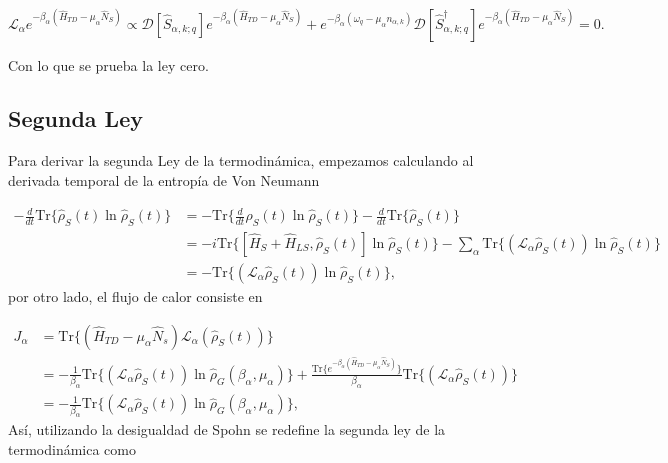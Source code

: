 \begin{appendixs}
\begin{equation*}
    \mathcal{L}_{\alpha}e^{-\beta_{\alpha}(\hat{H}_{TD} - \mu_{\alpha}\hat{N}_{S})} \propto  \mathcal{D}[\hat{S}_{\alpha,k;q}]e^{-\beta_{\alpha}(\hat{H}_{TD} - \mu_{\alpha}\hat{N}_{S})} + e^{-\beta_{\alpha}(\omega_{q} - \mu_{\alpha}n_{\alpha,k})}\mathcal{D}[\hat{S}^{\dagger}_{\alpha,k;q}]e^{-\beta_{\alpha}(\hat{H}_{TD} - \mu_{\alpha}\hat{N}_{S})} = 0.
\end{equation*}

Con lo que se prueba la ley cero.

\newpage


\subsection{Segunda Ley}
Para derivar la segunda Ley de la termodinámica, empezamos calculando al derivada temporal de la entropía de Von Neumann

\begin{align*}
    - \frac{d}{dt}\text{Tr}\{ \hat{\rho}_{S}(t)\ln \hat{\rho}_{S}(t) \} & =  -\text{Tr}\Big\{ \frac{d}{dt}\hat{\rho}_{S}(t)\ln \hat{\rho}_{S}(t) \Big\} - \frac{d}{dt}\text{Tr}\{\hat{\rho}_{S}(t) \}\\
  & = - i \text{Tr}\{[\hat{H}_{S}+\hat{H}_{LS},\hat{\rho}_{S}(t)]\ln \hat{\rho}_{S}(t)  \} - \sum_{\alpha} \text{Tr}\{(\mathcal{L}_{\alpha}\hat{\rho}_{S}(t)) \ln \hat{\rho}_{S}(t) \}  \\
  & = -\text{Tr}\{(\mathcal{L}_{\alpha}\hat{\rho}_{S}(t)) \ln \hat{\rho}_{S}(t) \},
\end{align*}
por otro lado, el flujo de calor consiste en 

\begin{align*}
    J_{\alpha} & = \text{Tr}\{ (\hat{H}_{TD} - \mu_{\alpha}\hat{N}_{s})\mathcal{L}_{\alpha}(\hat{\rho}_{S}(t)) \} \\
    & = -\frac{1}{\beta_{\alpha}} \text{Tr}\{(\mathcal{L}_{\alpha}\hat{\rho}_{S}(t)) \ln \hat{\rho}_{G}(\beta_{\alpha},\mu_{\alpha})  \} + \frac{\text{Tr}\{e^{-\beta_{\alpha}(\hat{H}_{TD} - \mu_{\alpha}\hat{N}_{S})} \} }{\beta_{\alpha}} \text{Tr}\{(\mathcal{L}_{\alpha}\hat{\rho}_{S}(t)) \} \\
    & = -\frac{1}{\beta_{\alpha}} \text{Tr}\{(\mathcal{L}_{\alpha}\hat{\rho}_{S}(t))\ln \hat{\rho}_{G}(\beta_{\alpha},\mu_{\alpha})  \},
\end{align*}
Así, utilizando la desigualdad de Spohn se redefine la segunda ley de la termodinámica como


\end{appendixs}
